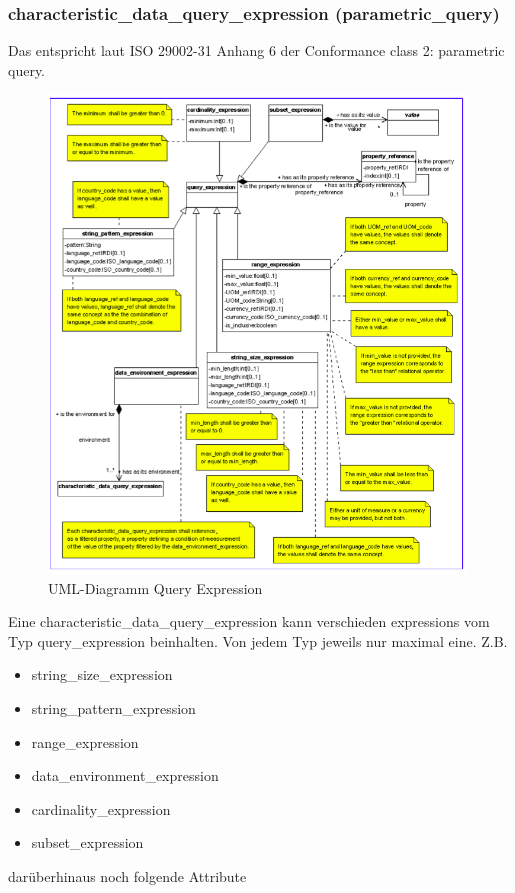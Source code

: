 \subsubsection{characteristic\_data\_query\_expression (parametric\_query)}
Das entspricht laut ISO 29002-31 Anhang 6 der Conformance class 2: parametric query.

\begin{figure}[htbp]
	\centering
		\includegraphics[width=0.99\textwidth]{images/query_expression.png}
		\caption[UML-Diagramm Query Expression]{UML-Diagramm Query Expression\footnotemark}
	\label{fig:querymain}
\end{figure}

Eine characteristic\_data\_query\_expression kann verschieden expressions vom Typ query\_expression beinhalten. Von jedem Typ jeweils nur maximal eine. 
Z.B.
\begin{itemize}
\item string\_size\_expression
\item string\_pattern\_expression
\item range\_expression
\item data\_environment\_expression
\item cardinality\_expression
\item subset\_expression
\end{itemize}
darüberhinaus noch folgende Attribute

